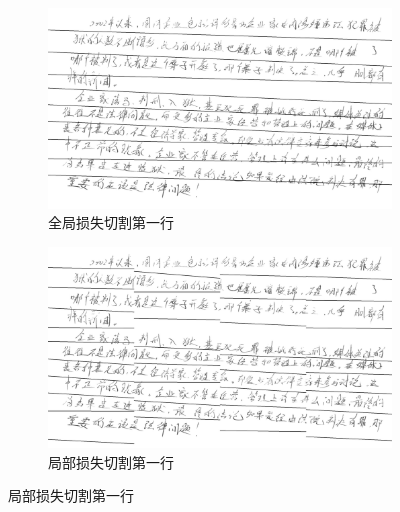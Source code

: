 \begin{figure}[ht!]
	\centering
	\begin{subfigure}{.69\textwidth}
		\centering
		\includegraphics[width=1.0\textwidth]{figure/chapter4/line1.png}
		\caption{全局损失切割第一行}
		\label{fig:line1}
	\end{subfigure}
	\begin{subfigure}{.3\textwidth}
		\centering
		\includegraphics[width=1.0\textwidth]{figure/chapter4/line2.png}
		\caption{局部损失切割第一行}
		\label{fig:line2}
	\end{subfigure}
	

\end{figure}
